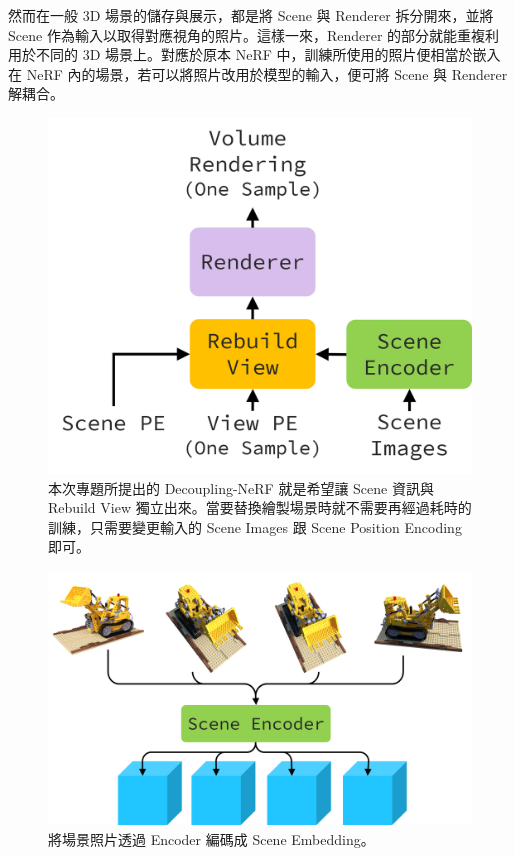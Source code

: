 \documentclass[10pt,twocolumn,letterpaper]{article}
\begin{document}
\begin{CJK}{UTF8}{bkai}
   然而在一般 3D 場景的儲存與展示，都是將 Scene 與 Renderer 拆分開來，並將 Scene
   作為輸入以取得對應視角的照片。這樣一來，Renderer 的部分就能重複利用於不同的
   3D 場景上。對應於原本 NeRF 中，訓練所使用的照片便相當於嵌入在 NeRF
   內的場景，若可以將照片改用於模型的輸入，便可將 Scene 與 Renderer 解耦合。
   \begin{figure}[t]
      \begin{center}
         \includegraphics[width=0.9\linewidth]{img/Decoupling-NeRF.png}
      \end{center}
      \caption{
         本次專題所提出的 Decoupling-NeRF 就是希望讓 Scene
         資訊與 Rebuild View 獨立出來。當要替換繪製場景時就不需要再經過耗時的訓練，只需要變更輸入的
         Scene Images 跟 Scene Position Encoding 即可。
      }
      \label{fig:Decoupling-NeRF}
   \end{figure}

   \begin{figure}[t]
      \begin{center}
         \includegraphics[width=1\linewidth]{img/encode-scene.png}
      \end{center}
      \caption{
         將場景照片透過 Encoder 編碼成 Scene Embedding。
      }
      \label{fig:encode-scene}
   \end{figure}


\end{CJK}
\end{document}
